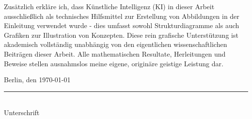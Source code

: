 Zusätzlich erkläre ich, dass Künstliche Intelligenz (KI) in dieser Arbeit ausschließlich als technisches Hilfsmittel zur Erstellung von Abbildungen in der Einleitung verwendet wurde - dies umfasst sowohl Strukturdiagramme als auch Grafiken zur Illustration von Konzepten. Diese rein grafische Unterstützung ist akademisch vollständig unabhängig von den eigentlichen wissenschaftlichen Beiträgen dieser Arbeit. Alle mathematischen Resultate, Herleitungen und Beweise stellen ausnahmslos meine eigene, originäre geistige Leistung dar.

\vspace{2cm}
\noindent
Berlin, den \today \hfill \rule{6cm}{0.4pt}\\
\hspace*{0pt}\hfill Unterschrift